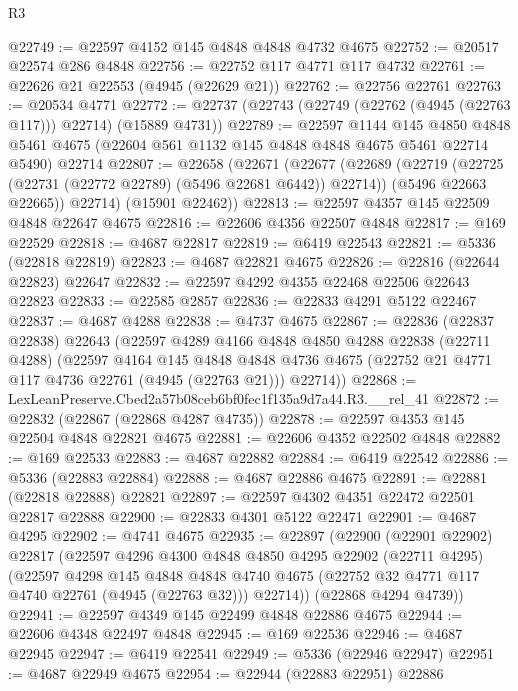 \begin{lexlean}{R3}
\begin{coremodule}
@22749 := @22597 @4152 @145 @4848 @4848 @4732 @4675
@22752 := @20517 @22574 @286 @4848
@22756 := @22752 @117 @4771 @117 @4732
@22761 := @22626 @21 @22553 (@4945 (@22629 @21))
@22762 := @22756 @22761
@22763 := @20534 @4771
@22772 := @22737 (@22743 (@22749 (@22762 (@4945 (@22763 @117))) @22714) (@15889 @4731))
@22789 := @22597
    @1144
    @145
    @4850
    @4848
    @5461
    @4675
    (@22604 @561 @1132 @145 @4848 @4848 @4675 @5461 @22714 @5490)
    @22714
@22807 := @22658
    (@22671
      (@22677
        (@22689
          (@22719 (@22725 (@22731 (@22772 @22789) (@5496 @22681 @6442)) @22714))
          (@5496 @22663 @22665))
        @22714)
      (@15901 @22462))
@22813 := @22597 @4357 @145 @22509 @4848 @22647 @4675
@22816 := @22606 @4356 @22507 @4848
@22817 := @169 @22529
@22818 := @4687 @22817
@22819 := @6419 @22543
@22821 := @5336 (@22818 @22819)
@22823 := @4687 @22821 @4675
@22826 := @22816 (@22644 @22823) @22647
@22832 := @22597 @4292 @4355 @22468 @22506 @22643 @22823
@22833 := @22585 @2857
@22836 := @22833 @4291 @5122 @22467
@22837 := @4687 @4288
@22838 := @4737 @4675
@22867 := @22836
    (@22837 @22838)
    @22643
    (@22597
      @4289
      @4166
      @4848
      @4850
      @4288
      @22838
      (@22711 @4288)
      (@22597
        @4164
        @145
        @4848
        @4848
        @4736
        @4675
        (@22752 @21 @4771 @117 @4736 @22761 (@4945 (@22763 @21)))
        @22714))
@22868 := LexLeanPreserve.Cbed2a57b08ceb6bf0fec1f135a9d7a44.R3.__rel_41
@22872 := @22832 (@22867 (@22868 @4287 @4735))
@22878 := @22597 @4353 @145 @22504 @4848 @22821 @4675
@22881 := @22606 @4352 @22502 @4848
@22882 := @169 @22533
@22883 := @4687 @22882
@22884 := @6419 @22542
@22886 := @5336 (@22883 @22884)
@22888 := @4687 @22886 @4675
@22891 := @22881 (@22818 @22888) @22821
@22897 := @22597 @4302 @4351 @22472 @22501 @22817 @22888
@22900 := @22833 @4301 @5122 @22471
@22901 := @4687 @4295
@22902 := @4741 @4675
@22935 := @22897
    (@22900
      (@22901 @22902)
      @22817
      (@22597
        @4296
        @4300
        @4848
        @4850
        @4295
        @22902
        (@22711 @4295)
        (@22597
          @4298
          @145
          @4848
          @4848
          @4740
          @4675
          (@22752 @32 @4771 @117 @4740 @22761 (@4945 (@22763 @32)))
          @22714))
      (@22868 @4294 @4739))
@22941 := @22597 @4349 @145 @22499 @4848 @22886 @4675
@22944 := @22606 @4348 @22497 @4848
@22945 := @169 @22536
@22946 := @4687 @22945
@22947 := @6419 @22541
@22949 := @5336 (@22946 @22947)
@22951 := @4687 @22949 @4675
@22954 := @22944 (@22883 @22951) @22886

\end{coremodule}
\end{lexlean}
